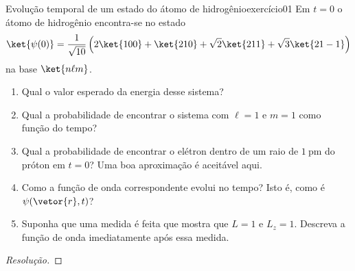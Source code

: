 \begin{exercício}{Evolução temporal de um estado do átomo de hidrogênio}{exercício01}
    Em \(t = 0\) o átomo de hidrogênio encontra-se no estado
    \begin{equation*}
        \ket{\psi(0)} = \frac1{\sqrt{10}} \left(2 \ket{100} + \ket{210} + \sqrt{2} \ket{211} + \sqrt{3}\ket{21 -1}\right)
    \end{equation*}
    na base \(\ket{n\ell m}\).
    \begin{enumerate}[label=(\alph*)]
        \item Qual o valor esperado da energia desse sistema?
        \item Qual a probabilidade de encontrar o sistema com \(\ell = 1\) e \(m = 1\) como função do tempo?
        \item Qual a probabilidade de encontrar o elétron dentro de um raio de \(\SI{1}{\pico\meter}\) do próton em \(t = 0\)? Uma boa aproximação é aceitável aqui.
        \item Como a função de onda correspondente evolui no tempo? Isto é, como é \(\psi(\vetor{r}, t)\)?
        \item Suponha que uma medida é feita que mostra que \(L = 1\) e \(L_z = 1\). Descreva a função de onda imediatamente após essa medida.
    \end{enumerate}
\end{exercício}
\begin{proof}[Resolução]

\end{proof}
